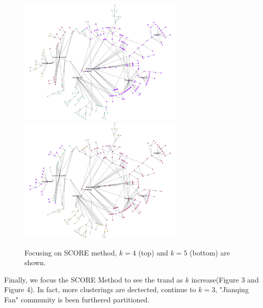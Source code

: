 \documentclass{article}
\numberwithin{equation}{section}
\begin{document}
\begin{figure}[H]
	\centering
	\includegraphics[width=0.7\textwidth]{trend/giantcoau-score-4.png}
	\includegraphics[width=0.7\textwidth]{trend/giantcoau-score-5.png}
	\caption{Focusing on SCORE method, $k=4$ (top) and $k=5$ (bottom) are shown.}
\end{figure}

Finally, we focus the SCORE Method to see the trand as $k$ increase(Figure 3 and Figure 4). In fact, more clusterings are dectected, continue to $k=3$, "Jianqing Fan" community is been furthered partitioned.
\end{document}
